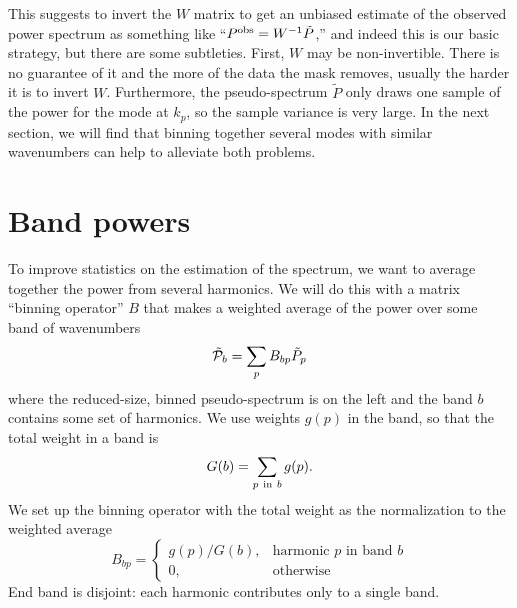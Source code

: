 This suggests to invert the $W$ matrix to get an unbiased estimate of the observed power spectrum as something like ``${P}^{\rm obs} = W^{-1} \tilde P$,'' and indeed this is our basic strategy, but there are some subtleties.  First, $W$ may be non-invertible.  There is no guarantee of it and the more of the data the mask removes, usually the harder it is to invert $W$.  Furthermore, the pseudo-spectrum $\tilde P$ only draws one sample of the power for the mode at $k_p$, so the sample variance is very large.  In the next section, we will find that binning together several modes with similar wavenumbers can help to alleviate both problems.

\section{Band powers}
To improve statistics on the estimation of the spectrum, we want to average together the power from several harmonics.  We will do this with a matrix ``binning operator'' $B$ that makes a weighted average of the power over some band of wavenumbers
\begin{equation}
  \tilde {\cal P}_b  = \sum_p B_{bp} \tilde P_p
\end{equation}
where the reduced-size, binned pseudo-spectrum is on the left and the band $b$ contains some set of harmonics.   We use weights $g(p)$ in the band, so that the total weight in a band is
\begin{equation}
  G(b) = \sum_{p\ {\rm in}\ b} g(p).
\end{equation}
We set up the binning operator with the total weight as the normalization to the weighted average
\begin{equation}
  B_{bp} = \left\{
  \begin{array}{ll}
   g(p)/G(b), &  \mbox{harmonic $p$ in band $b$} \\
   0, & \mbox{otherwise}
  \end{array} 
  \right.
\end{equation}
End band is disjoint: each harmonic contributes only to a single band.


